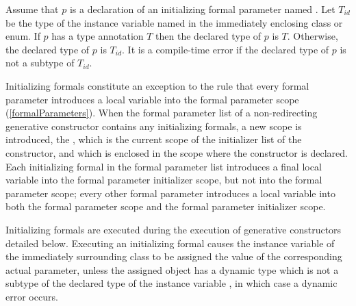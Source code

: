\documentclass[makeidx]{article}
\begin{document}

\LMHash{}%
Assume that $p$ is a declaration of an initializing formal parameter named \id.
Let $T_{id}$ be the type of the instance variable named \id{} in
the immediately enclosing class or enum.
If $p$ has a type annotation $T$ then the declared type of $p$ is $T$.
Otherwise, the declared type of $p$ is $T_{id}$.
It is a compile-time error if the declared type of $p$
is not a subtype of $T_{id}$.

\LMHash{}%
Initializing formals constitute an exception to the rule that
every formal parameter introduces a local variable into
the formal parameter scope (\ref{formalParameters}).
When the formal parameter list of a non-redirecting generative constructor
contains any initializing formals, a new scope is introduced, the
,
which is the current scope of the initializer list of the constructor,
and which is enclosed in the scope where the constructor is declared.
Each initializing formal in the formal parameter list
introduces a final local variable into the formal parameter initializer scope,
but not into the formal parameter scope;
every other formal parameter introduces a local variable into
both the formal parameter scope and the formal parameter initializer scope.


\LMHash{}%
Initializing formals are executed during
the execution of generative constructors detailed below.
Executing an initializing formal 
causes the instance variable \id{} of the immediately surrounding class
to be assigned the value of the corresponding actual parameter,
unless the assigned object has a dynamic type
which is not a subtype of the declared type of the instance variable \id,
in which case a dynamic error occurs.
\end{document}
